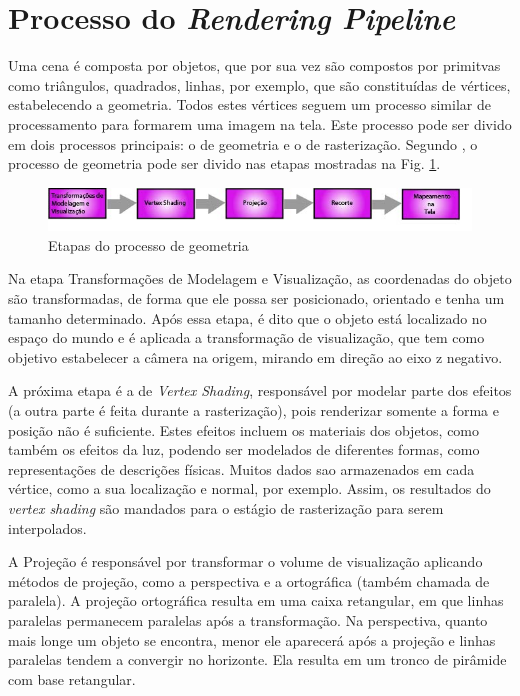 \section{Processo do \textit{Rendering Pipeline}}


	Uma cena é composta por objetos, que por sua vez são compostos por primitvas como triângulos, quadrados, linhas, por exemplo, que são constituídas de vértices, estabelecendo a geometria. Todos estes vértices seguem um processo similar de processamento para formarem uma imagem na tela.  Este processo pode ser divido em dois processos principais: o de geometria e o de rasterização.  Segundo \cite{realtime}, o processo de geometria pode ser divido nas etapas mostradas na Fig. \ref{geometria}.

	\begin{figure}[h]
	\centering
		\includegraphics[keepaspectratio=true,scale=0.8]{figuras/geometria.jpg}
	\caption{Etapas do processo de geometria}
	\label{geometria}
	\end{figure}

	Na etapa Transformações de Modelagem e Visualização, as coordenadas do objeto são transformadas, de forma que ele possa ser posicionado, orientado e tenha um tamanho determinado. Após essa etapa, é dito que o objeto está localizado no espaço do mundo e é aplicada a transformação de visualização, que tem como objetivo estabelecer a câmera na origem, mirando em direção ao eixo z negativo. 

	A próxima etapa é a de \textit{Vertex Shading}, responsável por modelar parte dos efeitos (a outra parte é feita durante a rasterização), pois renderizar somente a forma e posição não é suficiente.  Estes efeitos incluem os materiais dos objetos, como também os efeitos da luz, podendo ser modelados de diferentes formas, como representações de descrições físicas. Muitos dados sao armazenados em cada vértice, como a sua localização e normal, por exemplo. Assim, os resultados do \textit{vertex shading} são mandados para o estágio de rasterização para serem interpolados. 

	A Projeção é responsável por transformar o volume de visualização aplicando métodos de projeção, como a perspectiva e a ortográfica (também chamada de paralela). A projeção ortográfica resulta em uma caixa retangular, em que linhas paralelas permanecem paralelas após a transformação. Na perspectiva, quanto mais longe um objeto se encontra, menor ele aparecerá após a projeção e linhas paralelas tendem a convergir no horizonte. Ela resulta em um tronco de pirâmide com base retangular. 

